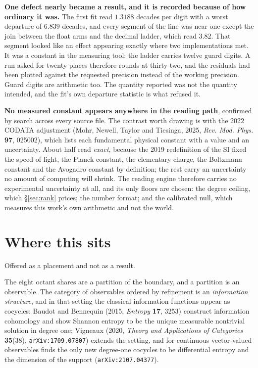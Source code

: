 \textbf{One defect nearly became a result, and it is recorded because of how ordinary it was.} The first fit read \(1.3188\) decades per digit with a worst departure of \(6.839\) decades, and every segment of the line was near one except the join between the float arms and the decimal ladder, which read \(3.82\). That segment looked like an effect appearing exactly where two implementations met. It was a constant in the measuring tool: the ladder carries twelve guard digits. A run asked for twenty places therefore rounds at thirty-two, and the residuals had been plotted against the requested precision instead of the working precision. Guard digits are arithmetic too. The quantity reported was not the quantity intended, and the fit's own departure statistic is what refused it.

\textbf{No measured constant appears anywhere in the reading path}, confirmed by search across every source file. The contrast worth drawing is with the 2022 CODATA adjustment (Mohr, Newell, Taylor and Tiesinga, 2025, \emph{Rev. Mod. Phys.} \textbf{97}, 025002), which lists each fundamental physical constant with a value and an uncertainty. About half read \emph{exact}, because the 2019 redefinition of the SI fixed the speed of light, the Planck constant, the elementary charge, the Boltzmann constant and the Avogadro constant by definition; the rest carry an uncertainty no amount of computing will shrink. The reading engine therefore carries no experimental uncertainty at all, and its only floors are chosen: the degree ceiling, which \S\ref{sec:rank} prices; the number format; and the calibrated null, which measures this work's own arithmetic and not the world.

\section{Where this sits}

Offered as a placement and not as a result.

The eight octant shares are a partition of the boundary, and a partition is an observable. The category of observables ordered by refinement is an \emph{information structure}, and in that setting the classical information functions appear as cocycles: Baudot and Bennequin (2015, \emph{Entropy} \textbf{17}, 3253) construct information cohomology and show Shannon entropy to be the unique measurable nontrivial solution in degree one; Vigneaux (2020, \emph{Theory and Applications of Categories} \textbf{35}(38), \texttt{arXiv:1709.07807}) extends the setting, and for continuous vector-valued observables finds the only new degree-one cocycles to be differential entropy and the dimension of the support (\texttt{arXiv:2107.04377}).

